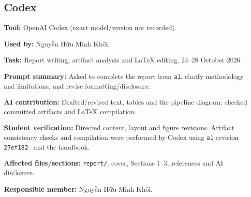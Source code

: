 \subsection*{Codex}
\textbf{Tool:} OpenAI Codex (exact model/version not recorded).\par
\textbf{Used by:} Nguyễn Hữu Minh Khôi.\par
\textbf{Task:} Report writing, artifact analysis and LaTeX editing, 24--28 October 2026.\par
\textbf{Prompt summary:} Asked to complete the report from \texttt{a1}, clarify methodology and limitations, and revise formatting/disclosure.\par
\textbf{AI contribution:} Drafted/revised text, tables and the pipeline diagram; checked committed artifacts and LaTeX compilation.\par
\textbf{Student verification:} Directed content, layout and figure revisions. Artifact consistency checks and compilation were performed by Codex using \texttt{a1} revision \texttt{27ef182}~\cite{code} and the handbook.\par
\textbf{Affected files/sections:} \texttt{report/}; cover, Sections 1--3, references and AI disclosure.\par
\textbf{Responsible member:} Nguyễn Hữu Minh Khôi.
\endgroup
